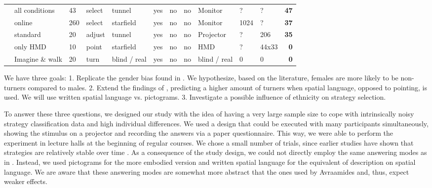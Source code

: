 \documentclass{frontiersSCNS} %
\begin{document}
\begin{table}[h!]
\begin{flushleft}
{\begin{tabular}{lll|ll|llllll|r}
\cite{Gramann2005} & all conditions & 43 & select & tunnel & yes & no & no & Monitor & ? & ? & \textbf{47} \\ 
\cite{Goeke2013} & online & 260 & select & starfield & yes & no & no & Monitor & 1024 & ? & \textbf{37} \\ 
\cite{Chiu2012} & standard & 20 & adjust & tunnel & yes & no & no & Projector & ? & 206 & \textbf{35} \\ 
\cite{Klatzky1998} & only HMD & 10 & point & starfield & yes & no & no & HMD & ? & 44x33 & \textbf{0} \\ 
\cite{Avraamides2004} & Imagine \& walk & 20 & turn & blind / real & yes & no & no & blind / real & 0 & 0 & \textbf{0} \\ 
\end{tabular}
}
\end{flushleft}
\label{tab:studyOverview}
\end{table}


We have three goals:
1. Replicate the gender bias found in \citep{Goeke2013}. We hypothesize, based on the literature, females are more likely to be non-turners compared to males.
2. Extend the findings of \cite{Avraamides2004}, predicting a higher amount of turners when spatial language, opposed to pointing, is used. We will use written spatial language vs. pictograms.
3. Investigate a possible influence of ethnicity on strategy selection.

To answer these three questions, we designed our study with the idea of having a very large sample size to cope with intrinsically noisy strategy classification data and high individual differences. We used a design that could be executed with many participants simultaneously, showing the stimulus on a projector and recording the answers via a paper questionnaire. This way, we were able to perform the experiment in lecture halls at the beginning of regular courses. We chose a small number of trials, since earlier studies have shown that strategies are relatively stable over time \citep{Goeke2013}. As a consequence of the study design, we could not directly employ the same answering modes as in \cite{Avraamides2004}. Instead, we used pictograms for the more embodied version and written spatial language for the equivalent of description on spatial language. We are aware that these answering modes are somewhat more abstract that the ones used by Avraamides and, thus, expect weaker effects.
\end{document}
